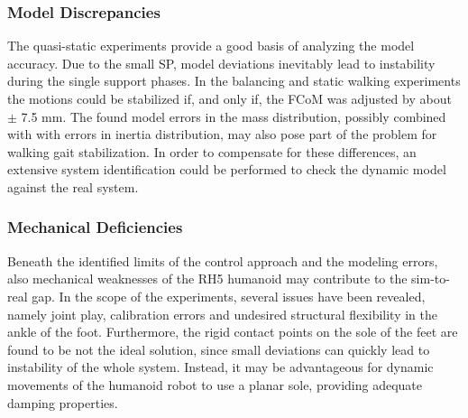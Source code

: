 \subsubsection{Model Discrepancies}
The quasi-static experiments provide a good basis of analyzing the model accuracy. Due to the small \gls{SP}, model deviations inevitably lead to instability during the single support phases. In the balancing and static walking experiments the motions could be stabilized if, and only if, the \gls{FCoM} was adjusted by about $\pm$ 7.5 mm. The found model errors in the mass distribution, possibly combined with with errors in inertia distribution, may also pose part of the problem for walking gait stabilization. In order to compensate for these differences, an extensive system identification could be performed to check the dynamic model against the real system.
\subsubsection{Mechanical Deficiencies}
Beneath the identified limits of the control approach and the modeling errors, also mechanical weaknesses of the RH5 humanoid may contribute to the sim-to-real gap. In the scope of the experiments, several issues have been revealed, namely joint play, calibration errors and undesired structural flexibility in the ankle of the foot. Furthermore, the rigid contact points on the sole of the feet are found to be not the ideal solution, since small deviations can quickly lead to instability of the whole system. Instead, it may be advantageous for dynamic movements of the humanoid robot to use a planar sole, providing adequate damping properties. 


























